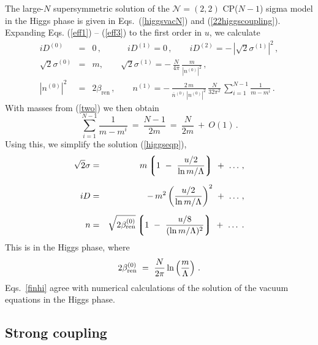 \documentclass[epsfig,12pt]{article}
\def\beq{\begin{equation}}
\def\eeq{\end{equation}}
\def\beqn{\begin{eqnarray}}
\def\eeqn{\end{eqnarray}}
\def\beqn{\begin{eqnarray}}
\def\eeqn{\end{eqnarray}}
\def\beq{\begin{equation}}
\def\eeq{\end{equation}}
\newcommand{\ntwot}{${\mathcal N}= \left(2,2\right) $ }
\newcommand{\ov}{\overline}
\newcommand{\lgr}{\left\lgroup}
\newcommand{\rgr}{\right\rgroup}
\newcommand{\nz}{{n^{(0)}}}
\newcommand{\no}{{n^{(1)}}}
\newcommand{\bnz}{{\ov{n}{}^{(0)}}}
\newcommand{\Dz}{{D^{(0)}}}
\newcommand{\Do}{{D^{(1)}}}
\newcommand{\sigz}{{\sigma^{(0)}}}
\newcommand{\sigo}{{\sigma^{(1)}}}
\newcommand{\bren}{{\beta_\text{ren}}}
\begin{document}
{	The large-$N$ supersymmetric solution of the \ntwot CP($N-1$) sigma model
	in the Higgs phase is
given in Eqs.~(\ref{higgsvacN}) and (\ref{22higgscoupling}).
Expanding Eqs. (\ref{eff1}) -- (\ref{eff3}) to the first order in $u$, we calculate
\beqn
	i \Dz 
	&=&
	 0\,,                    \qquad\quad      i\Do   = 0\,,  
			\qquad iD^{(2)} =  -\,|\sqrt{2}\sigo|^2\,, 
			\nonumber\\[3mm]
	\sqrt{2}\sigz &=& m,  \qquad       
	\sqrt{2}\sigo  = -\,\frac{N}{4\pi}\,\frac{m}{|\nz|^2}\,, 
	 \nonumber\\[3mm]
	|\nz|^2 
	&=&
	2\bren\,,              \qquad   
	\no =  -\,\frac{2\,m}{\bnz\,|\nz|^2}\,\frac{N}{32\pi^2}\,\sum_{i=1}^{N-1} \frac{1}{m - m^i}\,.
			\label{higgseqp}
			\eeqn
	With masses from (\ref{two}) we then obtain
\beq
	\sum_{i=1}^{N-1} \frac{1}{m - m^i} ~=~ \frac{N-1}{2m} ~=~ \frac{N}{2m} ~+~ O(1)\,.
	\label{higgseqpp}
\eeq
Using this, we simplify the solution (\ref{higgseqp}),
\beqn
%
	\sqrt{2}\sigma 
	&=&
	 m \lgr 1 ~-~ \frac{u/2}{{\rm ln}\, m/\Lambda} \rgr ~+~ \ldots \,,
	\nonumber\\[2mm]
%
	i D  
	&=&
	-\, m^2 \left( \frac{u/2}{{\rm ln}\, m/\Lambda} \right)^2  ~+~ \ldots\,,
	 \label{finhi}
	\\[2mm]
%
	n 
	&=&
	\sqrt{2\beta^{(0)}_{\rm ren}} \lgr 
			1 ~-~ \frac{ u/8 } { ( {\rm ln}\, m/\Lambda )^2 } \rgr ~+~ \ldots\;.
	\nonumber
\eeqn
This is in the Higgs phase, where
$$
2\beta^{(0)}_{\rm ren} ~=~ \frac{N}{2\pi}\,{\rm ln}\left(\frac{m}{\Lambda}\right)\,.
$$
Eqs.~\eqref{finhi} agree with numerical calculations of the solution of the 
vacuum equations in the Higgs phase. 

%
%
\subsection{Strong coupling}
\label{subsestrco}


}
\end{document}
